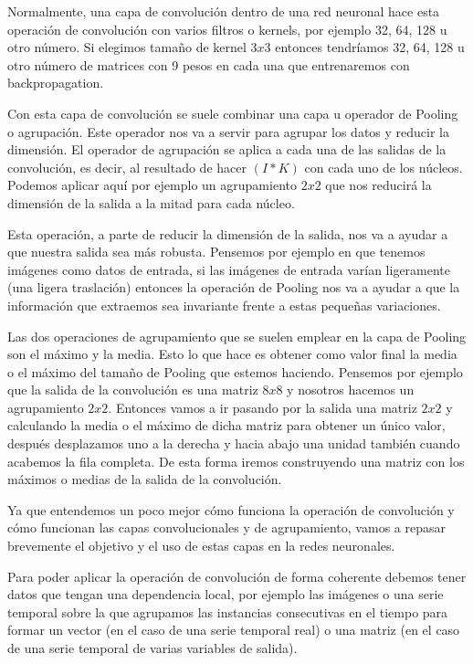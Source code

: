 Normalmente, una capa de convolución dentro de una red neuronal hace esta operación de convolución con varios filtros o kernels, por ejemplo 32, 64, 128 u otro número. Si elegimos tamaño de kernel $3x3$ entonces tendríamos 32, 64, 128 u otro número de matrices con 9 pesos en cada una que entrenaremos con backpropagation.

Con esta capa de convolución se suele combinar una capa u operador de Pooling o agrupación. Este operador nos va a servir para agrupar los datos y reducir la dimensión. El operador de agrupación se aplica a cada una de las salidas de la convolución, es decir, al resultado de hacer $(I*K)$ con cada uno de los núcleos. Podemos aplicar aquí por ejemplo un agrupamiento $2x2$ que nos reducirá la dimensión de la salida a la mitad para cada núcleo.

Esta operación, a parte de reducir la dimensión de la salida, nos va a ayudar a que nuestra salida sea más robusta. Pensemos por ejemplo en que tenemos imágenes como datos de entrada, si las imágenes de entrada varían ligeramente (una ligera traslación) entonces la operación de Pooling nos va a ayudar a que la información que extraemos sea invariante frente a estas pequeñas variaciones.

Las dos operaciones de agrupamiento que se suelen emplear en la capa de Pooling son el máximo y la media. Esto lo que hace es obtener como valor final la media o el máximo del tamaño de Pooling que estemos haciendo. Pensemos por ejemplo que la salida de la convolución es una matriz $8x8$ y nosotros hacemos un agrupamiento $2x2$. Entonces vamos a ir pasando por la salida una matriz $2x2$ y calculando la media o el máximo de dicha matriz para obtener un único valor, después desplazamos uno a la derecha y hacia abajo una unidad también cuando acabemos la fila completa. De esta forma iremos construyendo una matriz con los máximos o medias de la salida de la convolución.

Ya que entendemos un poco mejor cómo funciona la operación de convolución y cómo funcionan las capas convolucionales y de agrupamiento, vamos a repasar brevemente el objetivo y el uso de estas capas en la redes neuronales. 

Para poder aplicar la operación de convolución de forma coherente debemos tener datos que tengan una dependencia local, por ejemplo las imágenes o una serie temporal sobre la que agrupamos las instancias consecutivas en el tiempo para formar un vector (en el caso de una serie temporal real) o una matriz (en el caso de una serie temporal de varias variables de salida). 

